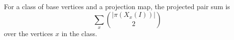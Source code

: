 \begin{definition}
For a class of base vertices and a projection map, the projected pair sum is
\[
\sum_x \binom{|\pi(X_x(I))|}{2}
\]
over the vertices \(x\) in the class.
\end{definition}
